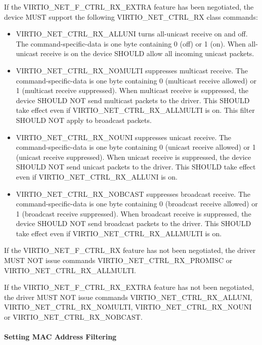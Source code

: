 If the VIRTIO_NET_F_CTRL_RX_EXTRA feature has been negotiated,
the device MUST support the following VIRTIO_NET_CTRL_RX class
commands:
\begin{itemize}
\item VIRTIO_NET_CTRL_RX_ALLUNI turns all-unicast receive on and
off. The command-specific-data is one byte containing 0 (off) or
1 (on). When all-unicast receive is on the device SHOULD allow
all incoming unicast packets.
\item VIRTIO_NET_CTRL_RX_NOMULTI suppresses multicast receive.
The command-specific-data is one byte containing 0 (multicast
receive allowed) or 1 (multicast receive suppressed).
When multicast receive is suppressed, the device SHOULD NOT
send multicast packets to the driver.
This SHOULD take effect even if VIRTIO_NET_CTRL_RX_ALLMULTI is on.
This filter SHOULD NOT apply to broadcast packets.
\item VIRTIO_NET_CTRL_RX_NOUNI suppresses unicast receive.
The command-specific-data is one byte containing 0 (unicast
receive allowed) or 1 (unicast receive suppressed).
When unicast receive is suppressed, the device SHOULD NOT
send unicast packets to the driver.
This SHOULD take effect even if VIRTIO_NET_CTRL_RX_ALLUNI is on.
\item VIRTIO_NET_CTRL_RX_NOBCAST suppresses broadcast receive.
The command-specific-data is one byte containing 0 (broadcast
receive allowed) or 1 (broadcast receive suppressed).
When broadcast receive is suppressed, the device SHOULD NOT
send broadcast packets to the driver.
This SHOULD take effect even if VIRTIO_NET_CTRL_RX_ALLMULTI is on.
\end{itemize}


If the VIRTIO_NET_F_CTRL_RX feature has not been negotiated,
the driver MUST NOT issue commands VIRTIO_NET_CTRL_RX_PROMISC or
VIRTIO_NET_CTRL_RX_ALLMULTI.

If the VIRTIO_NET_F_CTRL_RX_EXTRA feature has not been negotiated,
the driver MUST NOT issue commands
 VIRTIO_NET_CTRL_RX_ALLUNI,
 VIRTIO_NET_CTRL_RX_NOMULTI,
 VIRTIO_NET_CTRL_RX_NOUNI or
 VIRTIO_NET_CTRL_RX_NOBCAST.

\paragraph{Setting MAC Address Filtering}\label{sec:Device Types / Network Device / Device Operation / Control Virtqueue / Setting MAC Address Filtering}

